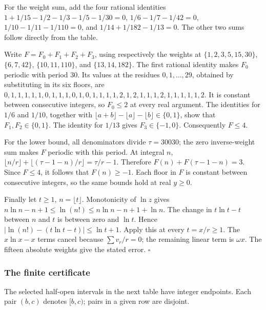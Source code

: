 \documentclass[
  11pt,
  a4paper,
]{article}
\begin{document}
For the weight sum, add the four rational identities
\(1+1/15-1/2-1/3-1/5-1/30=0\), \(1/6-1/7-1/42=0\),
\(1/10-1/11-1/110=0\), and \(1/14+1/182-1/13=0\). The other two sums
follow directly from the table.

Write \(F=F_0+F_1+F_2+F_3\), using respectively the weights at
\(\{1,2,3,5,15,30\}\), \(\{6,7,42\}\), \(\{10,11,110\}\), and
\(\{13,14,182\}\). The first rational identity makes \(F_0\) periodic
with period 30. Its values at the residues \(0,1,\ldots,29\), obtained
by substituting in its six floors, are
\(0,1,1,1,1,1,0,1,1,1,0,1,0,1,1,1,1,2,1,2,1,1,1,2,1,1,1,1,1,2\). It is
constant between consecutive integers, so \(F_0\le2\) at every real
argument. The identities for \(1/6\) and \(1/10\), together with
\(\lfloor a+b\rfloor-\lfloor a\rfloor-\lfloor b\rfloor\in\{0,1\}\), show
that \(F_1,F_2\in\{0,1\}\). The identity for \(1/13\) gives
\(F_3\in\{-1,0\}\). Consequently \(F\le4\).

For the lower bound, all denominators divide \(\tau=30030\); the zero
inverse-weight sum makes \(F\) periodic with this period. At integral
\(n\), \(\lfloor n/r\rfloor+\lfloor(\tau-1-n)/r\rfloor=\tau/r-1\).
Therefore \(F(n)+F(\tau-1-n)=3\). Since \(F\le4\), it follows that
\(F(n)\ge-1\). Each floor in \(F\) is constant between consecutive
integers, so the same bounds hold at real \(y\ge0\).

Finally let \(t\ge1\), \(n=\lfloor t\rfloor\). Monotonicity of \(\ln z\)
gives \(n\ln n-n+1\le\ln(n!)\le n\ln n-n+1+\ln n\). The change in
\(t\ln t-t\) between \(n\) and \(t\) is between zero and \(\ln t\).
Hence \(|\ln(n!)-(t\ln t-t)|\le\ln t+1\). Apply this at every
\(t=x/r\ge1\). The \(x\ln x-x\) terms cancel because \(\sum v_r/r=0\);
the remaining linear term is \(\omega x\). The fifteen absolute weights
give the stated error. \(\square\)

\subsubsection{The finite certificate}\label{the-finite-certificate}

The selected half-open intervals in the next table have integer
endpoints. Each pair \((b,c)\) denotes \([b,c)\); pairs in a given row
are disjoint.
\end{document}
